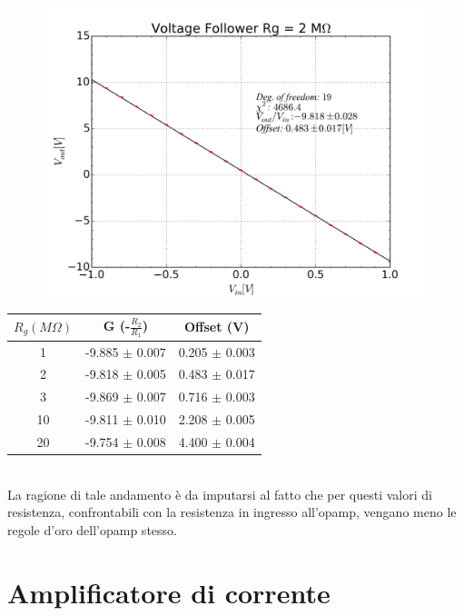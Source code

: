 \documentclass[journal, a4paper]{IEEEtran}
\begin{document}
\begin{figure}[htp]
\caption{}
\label{fit_2O}
\includegraphics[scale=.4]{fit_follower_1_21_2M_2k_22k.png}
\end{figure}



\begin{center}
\begin{tabular}{|c|c|c|}
\hline 
$R_g (M\Omega)$ & G (-$\frac{R_2}{R_1}$) & Offset (V) \\ 
\hline 
1 & -9.885 $\pm$ 0.007 & 0.205 $\pm$ 0.003 \\ 
\hline 
2 & -9.818 $\pm$ 0.005 & 0.483 $\pm$ 0.017 \\ 
\hline 
3 & -9.869 $\pm$ 0.007 & 0.716 $\pm$ 0.003 \\ 
\hline 
10 & -9.811 $\pm$ 0.010 & 2.208 $\pm$ 0.005 \\ 
\hline 
20 & -9.754 $\pm$ 0.008 & 4.400 $\pm$ 0.004 \\ 
\hline 
\end{tabular} 
\end{center}
~\\
La ragione di tale andamento è da imputarsi al fatto che per questi valori di resistenza, confrontabili con la resistenza in ingresso all'opamp, vengano meno le regole d'oro dell'opamp stesso.\\

\section{Amplificatore di corrente}
\end{document}
